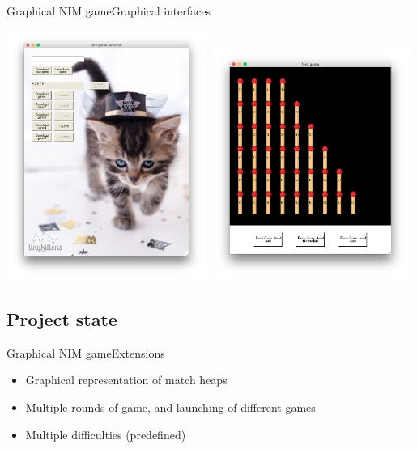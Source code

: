 \documentclass{beamer}
\begin{document}
\begin{frame}{Graphical NIM game}{Graphical interfaces}
\begin{center}
\includegraphics[width=0.49\textwidth]{launcher_ui} \includegraphics[width=0.49\textwidth]{game_ui}
\end{center}
\end{frame}

\subsection{Project state}
\begin{frame}{Graphical NIM game}{Extensions}
  \begin{itemize}
  \item {
    Graphical representation of match heaps
  }
  \item {
    Multiple rounds of game, and launching of different games
  }
  \item {
    Multiple difficulties (predefined)
  }
  \end{itemize}
\end{frame}
\end{document}
